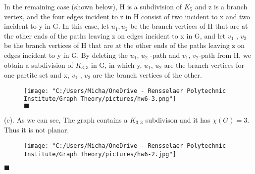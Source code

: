 \documentclass[12pt]{article}
\begin{document}
	In the remaining case (shown below), H is a subdivision of $K_5$ and z is a branch vertex, and the four edges incident to z in H consist of two incident to x and two incident to y in G. In this case, let $u_1,u_2$ be the branch vertices of H that are at the other ends of the paths leaving z on edges incident to x in G, and let $v_1$ , $v_2$ be the branch vertices of H that are at the other ends of the paths leaving z on edges incident to y in G. By deleting the $u_1$, $u_2$ -path and $v_1$, $v_2$-path
	from H, we obtain a subdivision of $K_{3,3}$ in G, in which y, $u_1$, $u_2$ are the branch vertices for one partite set and x, $v_1$ , $v_2$ are the branch vertices of the other.
		\begin{figure}[h]
		\begin{center}
			\texttt{[image: "C:/Users/Micha/OneDrive - Rensselaer Polytechnic Institute/Graph Theory/pictures/hw6-3.png"]}\\
				\hfill $\blacksquare$\\
		\end{center}
		
	\end{figure}

	\newpage
	(e). As we can see, The graph contains a $K_{3,3}$ subdivison and it has $\chi(G) = 3$. Thus it is not planar.	
	\begin{figure}[h]
		\begin{center}
			\texttt{[image: "C:/Users/Micha/OneDrive - Rensselaer Polytechnic Institute/Graph Theory/pictures/hw6-2.jpg"]}\\
		\end{center}
		
	\end{figure}

	\hfill $\blacksquare$
\end{document}
